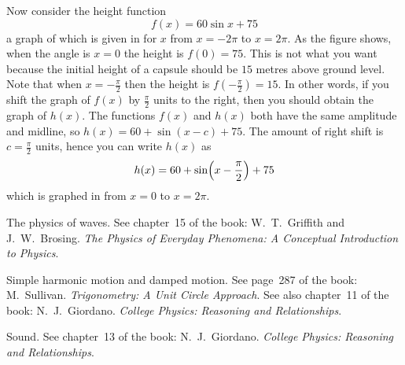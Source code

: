 \documentclass[a4paper,oneside,12pt]{article}
\begin{document}
\begin{problem}
{\begin{solution}
Now consider the height function
\begin{equation}
\label{eqn:trigonometric:london_eye_f(x)}
f(x)
=
60 \sin x + 75
\end{equation}
a graph of which is given in
 for $x$ from $x = -2\pi$ to
$x = 2\pi$.  As the figure shows, when the angle is $x = 0$ the height
is $f(0) = 75$.  This is not what you want because the initial height
of a capsule should be $15$ metres above ground level.  Note that when
$x = -\frac{\pi}{2}$ then the height is $f(-\frac{\pi}{2}) = 15$.  In
other words, if you shift the graph of $f(x)$ by $\frac{\pi}{2}$ units
to the right, then you should obtain the graph of $h(x)$.  The
functions $f(x)$ and $h(x)$ both have the same amplitude and midline,
so $h(x) = 60 + \sin(x - c) + 75$.  The amount of right shift is
$c = \frac{\pi}{2}$ units, hence you can write $h(x)$ as
\begin{equation}
\label{eqn:trigonometric:london_eye_height}
h(x)
=
60 + \sinp{x - \frac{\pi}{2}} + 75
\end{equation}
which is graphed in  from
$x = 0$ to $x = 2\pi$.
\end{solution}
}{}

\item The physics of waves.  See chapter~15 of the book:
  W.~T.~Griffith and J.~W.~Brosing.  \emph{The Physics of Everyday
    Phenomena: A Conceptual Introduction to Physics}.

\item Simple harmonic motion and damped motion.  See page~287 of the
  book: M.~Sullivan.  \emph{Trigonometry: A Unit Circle Approach}.
  See also chapter~11 of the book:  N.~J.~Giordano.
  \emph{College Physics: Reasoning and Relationships}.

\item Sound.  See chapter~13 of the book:  N.~J.~Giordano.
  \emph{College Physics: Reasoning and Relationships}.
\end{problem}
\end{document}
